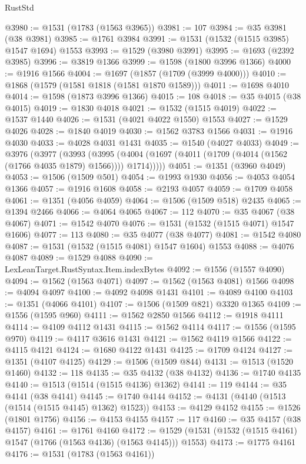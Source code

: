 \begin{lexlean}{RustStd}
\begin{coremodule}
@3980 := @1531 (@1783 (@1563 @3965))
@3981 := 107
@3984 := @35 @3981 (@38 @3981)
@3985 := @1761 @3984
@3991 := @1531 (@1532 (@1515 @3985) @1547 @1694) @1553
@3993 := @1529 (@3980 @3991)
@3995 := @1693 (@2392 @3985)
@3996 := @3819 @1366
@3999 := @1598 (@1800 @3996 @1366)
@4000 := @1916 @1566
@4004 := @1697 (@1857 (@1709 (@3999 @4000)))
@4010 := @1868 (@1579 (@1581 @1818 (@1581 @1870 @1589)))
@4011 := @1698 @4010
@4014 := @1598 (@1873 @3996 @1366)
@4015 := 108
@4018 := @35 @4015 (@38 @4015)
@4019 := @1830 @4018
@4021 := @1532 (@1515 @4019)
@4022 := @1537 @1440
@4026 := @1531 (@4021 @4022 @1550) @1553
@4027 := @1529 @4026
@4028 := @1840 @4019
@4030 := @1562 @3783 @1566
@4031 := @1916 @4030
@4033 := @4028 @4031 @1431
@4035 := @1540 (@4027 @4033)
@4049 := @3976
    (@3977
      (@3993
        (@3995 (@4004 (@1697 (@4011 (@1709 (@4014 (@1562 (@1766 @4035 @1879) @1566)))) @1714)))))
@4051 := @1351 (@3960 @4049)
@4053 := @1506 (@1509 @501)
@4054 := @1993 @1930
@4056 := @4053 @4054 @1366
@4057 := @1916 @1608
@4058 := @2193 @4057
@4059 := @1709 @4058
@4061 := @1351 (@4056 @4059)
@4064 := @1506 (@1509 @518) @2435
@4065 := @1394 @2466
@4066 := @4064 @4065
@4067 := 112
@4070 := @35 @4067 (@38 @4067)
@4071 := @1542 @4070
@4076 := @1531 (@1532 (@1515 @4071) @1547 @1606)
@4077 := 113
@4080 := @35 @4077 (@38 @4077)
@4081 := @1542 @4080
@4087 := @1531 (@1532 (@1515 @4081) @1547 @1604) @1553
@4088 := @4076 @4087
@4089 := @1529 @4088
@4090 := LexLeanTarget.RustSyntax.Item.indexBytes
@4092 := @1556 (@1557 @4090)
@4094 := @1562 (@1563 @4071)
@4097 := @1562 (@1563 @4081) @1566
@4098 := @4094 @4097
@4100 := @4092 @4098 @1431
@4101 := @4089 @4100
@4103 := @1351 (@4066 @4101)
@4107 := @1506 (@1509 @821) @3320 @1365
@4109 := @1556 (@1595 @960)
@4111 := @1562 @2850 @1566
@4112 := @1918 @4111
@4114 := @4109 @4112 @1431
@4115 := @1562 @4114
@4117 := @1556 (@1595 @970)
@4119 := @4117 @3616 @1431
@4121 := @1562 @4119 @1566
@4122 := @4115 @4121
@4124 := @1680 @4122 @1431
@4125 := @1709 @4124
@4127 := @1351 (@4107 @4125)
@4129 := @1506 (@1509 @844)
@4131 := @1513 (@1520 @1460)
@4132 := 118
@4135 := @35 @4132 (@38 @4132)
@4136 := @1740 @4135
@4140 := @1513 (@1514 (@1515 @4136) @1362)
@4141 := 119
@4144 := @35 @4141 (@38 @4141)
@4145 := @1740 @4144
@4152 := @4131 (@4140 (@1513 (@1514 (@1515 @4145) @1362) @1523))
@4153 := @4129 @4152
@4155 := @1526 (@1801 @1756)
@4156 := @4153 @4155
@4157 := 117
@4160 := @35 @4157 (@38 @4157)
@4161 := @1761 @4160
@4172 := @1529 (@1531 (@1532 (@1515 @4161) @1547 (@1766 (@1563 @4136) (@1563 @4145))) @1553)
@4173 := @1775 @4161
@4176 := @1531 (@1783 (@1563 @4161))

\end{coremodule}
\end{lexlean}
